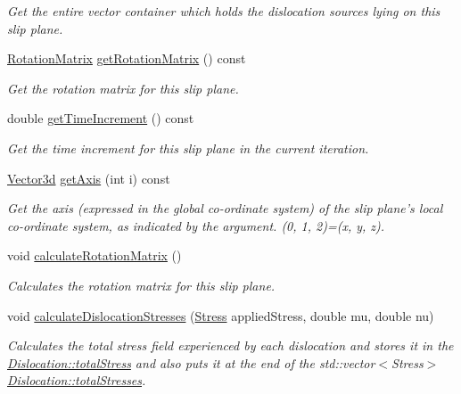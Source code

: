 \begin{DoxyCompactItemize}
\begin{DoxyCompactList}\small\item\em \-Get the entire vector container which holds the dislocation sources lying on this slip plane. \end{DoxyCompactList}\item 
\hyperlink{classRotationMatrix}{\-Rotation\-Matrix} \hyperlink{classSlipPlane_a774507778626c6a0fd72722c6781b652}{get\-Rotation\-Matrix} () const 
\begin{DoxyCompactList}\small\item\em \-Get the rotation matrix for this slip plane. \end{DoxyCompactList}\item 
double \hyperlink{classSlipPlane_a3033ebd3409bd18cd18a797c4ee7e340}{get\-Time\-Increment} () const 
\begin{DoxyCompactList}\small\item\em \-Get the time increment for this slip plane in the current iteration. \end{DoxyCompactList}\item 
\hyperlink{classVector3d}{\-Vector3d} \hyperlink{classSlipPlane_a83806b1e34cf044005d34920903e7074}{get\-Axis} (int i) const 
\begin{DoxyCompactList}\small\item\em \-Get the axis (expressed in the global co-\/ordinate system) of the slip plane's local co-\/ordinate system, as indicated by the argument. (0, 1, 2)=(x, y, z). \end{DoxyCompactList}\item 
void \hyperlink{classSlipPlane_a5d9054f21be225f50860ad1351e3a86f}{calculate\-Rotation\-Matrix} ()
\begin{DoxyCompactList}\small\item\em \-Calculates the rotation matrix for this slip plane. \end{DoxyCompactList}\item 
void \hyperlink{classSlipPlane_a2d4d2d031502d4a6f0aebbad0990b882}{calculate\-Dislocation\-Stresses} (\hyperlink{classStress}{\-Stress} applied\-Stress, double mu, double nu)
\begin{DoxyCompactList}\small\item\em \-Calculates the total stress field experienced by each dislocation and stores it in the \hyperlink{classDislocation_ae27176c0d47fec3e188d7caa4c52f366}{\-Dislocation\-::total\-Stress} and also puts it at the end of the std\-::vector$<$\-Stress$>$ \hyperlink{classDislocation_adb36ed6c1772f2614ffbed4dcc748c13}{\-Dislocation\-::total\-Stresses}. \end{DoxyCompactList}\item 

\end{DoxyCompactItemize}
